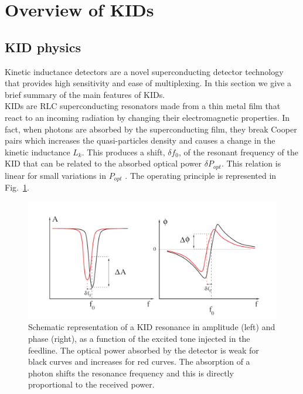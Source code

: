 \section{Overview of KIDs}
\label{sec2}
\subsection{KID physics}

Kinetic inductance detectors are a novel superconducting detector technology that provides high sensitivity and ease of multiplexing. In this section we give a brief summary of the main features of KIDs.\\
KIDs are RLC superconducting resonators made from a thin metal film that react to an incoming radiation by changing their electromagnetic properties. In fact, when photons are absorbed by the superconducting film, they break Cooper pairs which increases the quasi-particles density and causes a change in the kinetic inductance $L_{k}$. This produces a shift, $\delta f_{0}$, of the resonant frequency of the KID \citep{2013A&A...551L..12C} that can be related to the absorbed optical power $\delta P_{opt}$. This relation is linear for small variations in $P_{opt}$ \citep{2010ApPhL..96z3511S}. The operating principle is represented in Fig.~\ref{resonance}.\\

\begin{figure}[h]
\center
	\includegraphics[scale=0.4]{Figures/resonance.png}
	\caption{Schematic representation of a KID resonance in amplitude (left) and phase (right), as a function of the excited tone injected in the feedline. The optical power absorbed by the detector is weak for black curves and increases for red curves. The absorption of a photon shifts the resonance frequency and this is directly proportional to the received power.}
	\label{resonance}
\end{figure}

